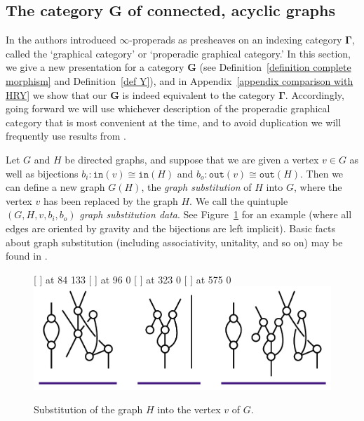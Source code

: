 \documentclass{amsart}
\numberwithin{theorem}{subsection}
\theoremstyle{definition}
\newcommand{\bbY}{\mathbf{G}}
\newcommand{\hryGamma}{\mathbf{\Gamma}}
\newcommand{\out}{\mathtt{out}}
\newcommand{\inp}{\mathtt{in}}
\begin{document}
\subsection{The category \texorpdfstring{$\bbY$}{G} of connected, acyclic graphs}\label{section subcategory bbY}
In \cite{hrybook} the authors introduced $\infty$-properads as presheaves on an indexing category $\hryGamma$, called the `graphical category' or `properadic graphical category.'
In this section, we give a new presentation for a category $\bbY$ (see Definition~\ref{definition complete morphism} and Definition~\ref{def Y}), and in Appendix~\ref{appendix comparison with HRY} we show that our $\bbY$ is indeed equivalent to the category $\hryGamma$.
Accordingly, going forward we will use whichever description of the properadic graphical category that is most convenient at the time, and to avoid duplication we will frequently use results from \cite{hrybook}.

Let $G$ and $H$ be directed graphs, and suppose that we are given a vertex $v\in G$ as well as bijections
$b_i \colon \inp(v) \cong \inp(H)$ and
$b_o \colon \out(v) \cong \out(H)$.
Then we can define a new graph $G(H)$, the \emph{graph substitution} of $H$ into $G$, where the vertex $v$ has been replaced by the graph $H$.
We call the quintuple $(G,H,v,b_i,b_o)$ \emph{graph substitution data}.
See Figure~\ref{figure graph substitution example} for an example (where all edges are oriented by gravity and the bijections are left implicit).
Basic facts about graph substitution (including associativity, unitality, and so on) may be found in \cite{YauJohnson:FPAM}.

\begin{figure}[htb]
\small\hair 2pt
  [ ] at 84 133
  [ ] at 96 0
  [ ] at 323 0
  [ ] at 575 0
\endlabellist
\centering
\includegraphics[width=\textwidth]{graph_substitution}
\caption{Substitution of the graph $H$ into the vertex $v$ of $G$.}
\label{figure graph substitution example}
\end{figure}
\end{document}
